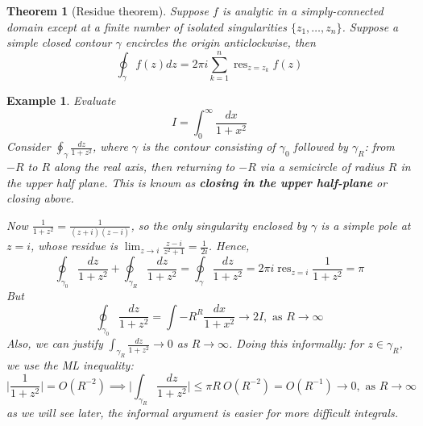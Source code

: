 \documentclass[a4paper]{article}
\DeclareMathOperator{\res}{res}
\newtheorem{eg}{Example}[section]
\theoremstyle{new}
\newtheorem{thm}{Theorem}[section]
\begin{document}
\begin{thm}[Residue theorem]
Suppose $f$ is analytic in a simply-connected domain except at a finite number of isolated singularities $\{z_1,\dots,z_n\}$. Suppose a simple closed contour $\gamma$ encircles the origin anticlockwise, then
$$\oint_\gamma f(z)dz=2\pi i\sum_{k=1}^n\res_{z=z_k}f(z)$$
\begin{center}
\end{center}
\end{thm}
\begin{eg}
Evaluate
$$I=\int_0^\infty\frac{dx}{1+x^2}$$
Consider $\oint_\gamma\frac{dz}{1+z^2}$, where $\gamma$ is the contour consisting of $\gamma_0$ followed by $\gamma_R$: from $-R$ to $R$ along the real axis, then returning to $-R$ via a semicircle of radius $R$ in the upper half plane. This is known as \textbf{closing in the upper half-plane} or closing above.
\begin{center}
  \end{center}
Now $\frac{1}{1+z^2}=\frac{1}{(z+i)(z-i)}$, so the only singularity enclosed by $\gamma$ is a simple pole at $z=i$, whose residue is $\lim_{z\rightarrow i}\frac{z-i}{z^2+1}=\frac{1}{2i}$. Hence,
$$\oint_{\gamma_0}\frac{dz}{1+z^2}+\oint_{\gamma_R}\frac{dz}{1+z^2}=\oint_{\gamma}\frac{dz}{1+z^2}=2\pi i\res_{z=i}\frac{1}{1+z^2}=\pi$$
But 
$$\oint_{\gamma_0}\frac{dz}{1+z^2}=\int{-R}^R\frac{dx}{1+x^2}\rightarrow 2I,\text{  as  }R\rightarrow\infty$$
Also, we can justify $\int_{\gamma_R}\frac{dz}{1+z^2}\rightarrow 0$ as $R\rightarrow\infty$. Doing this informally: for $z\in\gamma_R$, we use the ML inequality:
$$\bigg|\frac{1}{1+z^2}\bigg|=O(R^{-2})\implies\bigg|\int_{\gamma_R}\frac{dz}{1+z^2}\bigg|\leq\pi R~O(R^{-2})=O(R^{-1})\rightarrow 0,\text{ as }R\rightarrow\infty$$
as we will see later, the informal argument is easier for more difficult integrals.
\end{eg}
\end{document}
